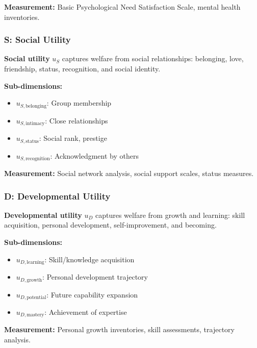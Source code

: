 \textbf{Measurement:} Basic Psychological Need Satisfaction Scale, mental health inventories.

\subsubsection{S: Social Utility}

\begin{definition}
\textbf{Social utility} $u_S$ captures welfare from social relationships:
belonging, love, friendship, status, recognition, and social identity.
\end{definition}

\textbf{Sub-dimensions:}
\begin{itemize}[nosep]
\item $u_{S,\text{belonging}}$: Group membership
\item $u_{S,\text{intimacy}}$: Close relationships
\item $u_{S,\text{status}}$: Social rank, prestige
\item $u_{S,\text{recognition}}$: Acknowledgment by others
\end{itemize}

\textbf{Measurement:} Social network analysis, social support scales, status measures.

\subsubsection{D: Developmental Utility}

\begin{definition}
\textbf{Developmental utility} $u_D$ captures welfare from growth and learning:
skill acquisition, personal development, self-improvement, and becoming.
\end{definition}

\textbf{Sub-dimensions:}
\begin{itemize}[nosep]
\item $u_{D,\text{learning}}$: Skill/knowledge acquisition
\item $u_{D,\text{growth}}$: Personal development trajectory
\item $u_{D,\text{potential}}$: Future capability expansion
\item $u_{D,\text{mastery}}$: Achievement of expertise
\end{itemize}

\textbf{Measurement:} Personal growth inventories, skill assessments, trajectory analysis.

